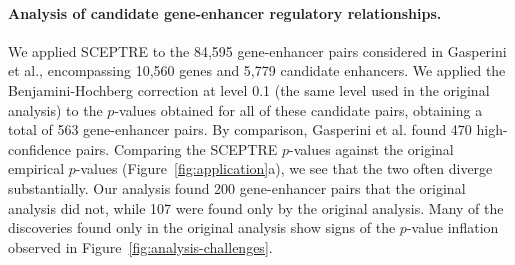 \documentclass{nature}
\begin{document}
\clearpage

\paragraph{Analysis of candidate gene-enhancer regulatory relationships.}

We applied SCEPTRE to the 84,595 gene-enhancer pairs considered in Gasperini et al., encompassing 10,560 genes and 5,779 candidate enhancers. We applied the Benjamini-Hochberg correction at level 0.1 (the same level used in the original analysis) to the $p$-values obtained for all of these candidate pairs, obtaining a total of 563 gene-enhancer pairs. By comparison, Gasperini et al. found 470 high-confidence pairs. Comparing the SCEPTRE $p$-values against the original empirical $p$-values (Figure~\ref{fig:application}a), we see that the two often diverge substantially. Our analysis found 200 gene-enhancer pairs that the original analysis did not, while 107 were found only by the original analysis. Many of the discoveries found only in the original analysis show signs of the $p$-value inflation observed in Figure~\ref{fig:analysis-challenges}. 
\end{document}
